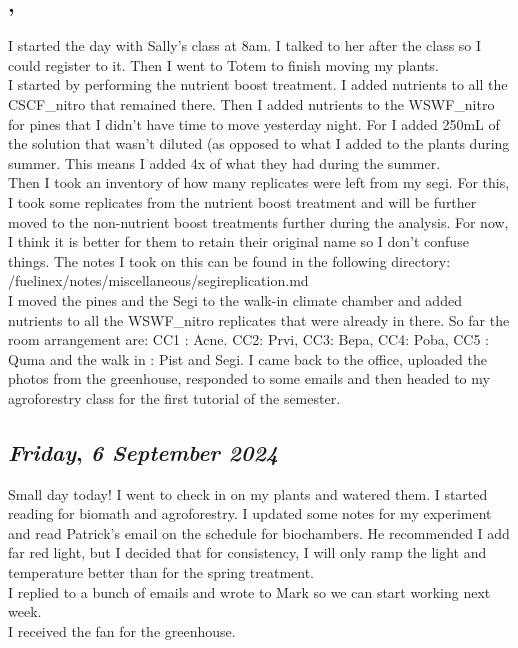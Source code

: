 \subsection*{\weekday, \day}
I started the day with Sally's class at 8am. I talked to her after the class so I could register to it. Then I went to Totem to finish moving my plants.\\
I started by performing the nutrient boost treatment. I added nutrients to all the CSCF\_nitro that remained there. Then I added nutrients to the WSWF\_nitro for pines that I didn't have time to move yesterday night. For I added 250mL of the solution that wasn't diluted (as opposed to what I added to the plants during summer. This means I added 4x of what they had during the summer. \\
Then I took an inventory of how many replicates were left from my segi. For this, I took some replicates from the nutrient boost treatment and will be further moved to the non-nutrient boost treatments further during the analysis. For now, I think it is better for them to retain their original name so I don't confuse things. The notes I took on this can be found in the following directory: /fuelinex/notes/miscellaneous/segireplication.md \\
I moved the pines and the Segi to the walk-in climate chamber and added nutrients to all the WSWF\_nitro replicates that were already in there. 
So far the room arrangement are: CC1 : Acne. CC2: Prvi, CC3: Bepa, CC4: Poba, CC5 : Quma and the walk in : Pist and Segi.
I came back to the office, uploaded the photos from the greenhouse, responded to some emails and then headed to my agroforestry class for the first tutorial of the semester.

\def\day{\textit{6 September 2024}}
\def\weekday{\textit{Friday}}
\subsection*{\weekday, \day}
Small day today!
I went to check in on my plants and watered them. 
I started reading for biomath and agroforestry. I updated some notes for my experiment and read Patrick's email on the schedule for biochambers. He recommended I add far red light, but I decided that for consistency, I will only ramp the light and temperature better than for the spring treatment. \\
I replied to a bunch of emails and wrote to Mark so we can start working next week.\\
I received the fan for the greenhouse. 

